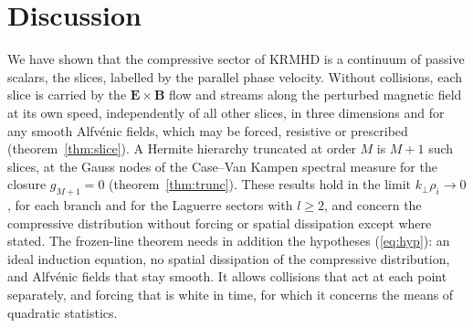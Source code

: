 \section{Discussion}\label{sec:discussion}

We have shown that the compressive sector of KRMHD is a continuum of passive scalars, the slices, labelled by the parallel phase velocity. Without collisions, each slice is carried by the $\boldsymbol E\times\boldsymbol B$ flow and streams along the perturbed magnetic field at its own speed, independently of all other slices, in three dimensions and for any smooth Alfv\'enic fields, which may be forced, resistive or prescribed (theorem~\ref{thm:slice}). A Hermite hierarchy truncated at order $M$ is $M+1$ such slices, at the Gauss nodes of the Case--Van Kampen spectral measure for the closure $g_{M+1}=0$ (theorem~\ref{thm:trunc}). These results hold in the limit $k_\perp\rho_i\to0$, for each branch and for the Laguerre sectors with $l\ge2$, and concern the compressive distribution without forcing or spatial dissipation except where stated. The frozen-line theorem needs in addition the hypotheses (\ref{eq:hyp}): an ideal induction equation, no spatial dissipation of the compressive distribution, and Alfv\'enic fields that stay smooth. It allows collisions that act at each point separately, and forcing that is white in time, for which it concerns the means of quadratic statistics.

